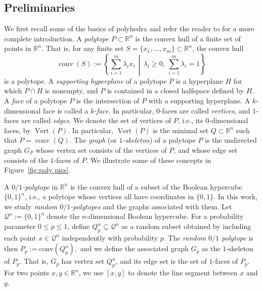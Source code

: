 \documentclass[11pt]{article}
\def\RR{{\mathbb R}}
\def\conv{\operatorname {conv}}
\def\Vert{\operatorname {Vert}}
\theoremstyle{definition}
\theoremstyle{plain}
\begin{document}
\subsection{Preliminaries}

We first recall some of the basics of polyhedra and refer the reader to \cite{GrunbaumBook,ZieglerBook} for a more complete introduction. 
A \emph{polytope} $P \subset \RR^n$ is the convex hull of a finite set of points in $\RR^n$. That is, for any finite set $S = \{x_1,\ldots, x_m\} \subset \RR^n$, the convex hull
\[
\conv(S) := \left\{ \sum_{i=1}^m \lambda_i x_i \,\middle|\, \lambda_i \geq 0,\ \sum_{i =1}^m \lambda_i = 1 \right\}
\]
is a polytope. A \emph{supporting hyperplane} of a polytope $P$ is a hyperplane $H$ for which $P \cap H$ is nonempty, and $P$ is contained in a closed halfspace defined by $H$. A \emph{face} of a polytope $P$ is the intersection of $P$ with a supporting hyperplane. A $k$-dimensional face is called a $k$-\emph{face}. In particular, $0$-faces are called \emph{vertices}, and $1$-faces are called \emph{edges}. We denote the set of vertices of $P$, i.e., its $0$-dimensional faces, by \( \Vert(P) \). In particular, \( \Vert(P) \) is the minimal set \( Q \subset \mathbb{R}^n \) such that \( P = \conv(Q) \).
The \emph{graph} (or \emph{$1$-skeleton}) of a polytope $P$ is the undirected graph $G_P$ whose vertex set consists of the vertices of $P$, and whose edge set consists of the $1$-faces of $P$. We illustrate some of these concepts in Figure~\ref{fig:poly pics}.



A \emph{$0/1$-polytope} in $\RR^n$ is the convex hull of a subset of the Boolean hypercube $\{0,1\}^n$, i.e., a polytope whose vertices all have coordinates in $\{0,1\}$. 
In this work, we study \emph{random $0/1$-polytopes} and the graphs associated with them.
Let $\mathcal{Q}^n := \{0,1\}^n$ denote the $n$-dimensional Boolean hypercube.
For a probability parameter $0 \leq p \leq 1$, define $Q^n_p \subseteq \mathcal{Q}^n$ as a random subset obtained by including each point $x \in \mathcal{Q}^n$ independently with probability $p$.
The \emph{random $0/1$ polytope} is then 
\(
P_p := \mathrm{conv}(Q_p^n),
\)
and we define the associated graph $G_p$ as the $1$-skeleton of $P_p$. That is, $G_p$ has vertex set $Q_p^n$, and its edge set is the set of $1$-faces of $P_p$. For two points $x,y\in \RR^n$, we use $[x,y]$ to denote the line segment between $x$ and $y$.
\end{document}
